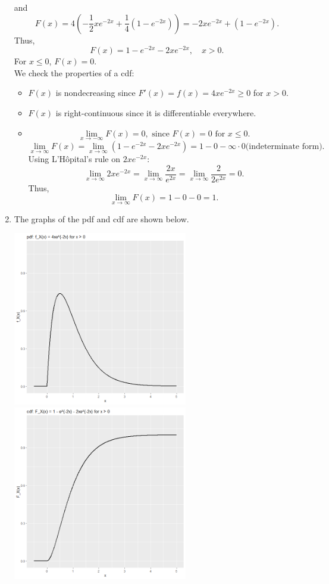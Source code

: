 \documentclass[12pt]{article}
\newenvironment{problem}[2][Problem]{\begin{trivlist}
\item[\hskip \labelsep {\bfseries #1}\hskip \labelsep {\bfseries #2.}]}
{\end{trivlist}}
\begin{document}
\begin{problem}{8}
\begin{enumerate}
\[    \]
    and
    \[
      F(x) = 4\left(-\frac{1}{2}xe^{-2x} + \frac{1}{4}(1 - e^{-2x})\right) = -2xe^{-2x} + (1 - e^{-2x}).
    \]
    Thus,
    \[
      F(x) = 1 - e^{-2x} - 2xe^{-2x}, \quad x > 0.
    \]
    For $x \le 0$, $F(x) = 0$.\\
    We check the properties of a cdf:
    \begin{itemize}
      \item[i.] $F(x)$ is nondecreasing since $F'(x) = f(x) = 4xe^{-2x} \ge 0$ for $x > 0$.
      \item[ii.] $F(x)$ is right-continuous since it is differentiable everywhere.
      \item[iii.] 
      \[
        \lim_{x \to -\infty} F(x) = 0, \text{ since } F(x) = 0 \text{ for } x \le 0.
      \]
      \[
        \lim_{x \to \infty} F(x) 
        = \lim_{x \to \infty} (1 - e^{-2x} - 2xe^{-2x}) 
        = 1 - 0 - \infty \cdot 0 \text{(indeterminate form)}.
      \]
      Using L'Hôpital's rule on $2xe^{-2x}$:
      \[
        \lim_{x \to \infty} 2xe^{-2x} 
        = \lim_{x \to \infty} \frac{2x}{e^{2x}} 
        = \lim_{x \to \infty} \frac{2}{2e^{2x}} = 0.
      \]
      Thus,
      \[
        \lim_{x \to \infty} F(x) = 1 - 0 - 0 = 1.
      \]
    \end{itemize}
    \item The graphs of the pdf and cdf are shown below.
    \begin{center}
      \includegraphics[width=0.6\textwidth]{8pdf.png}
      \includegraphics[width=0.6\textwidth]{8cdf.png}

\end{center}
\end{enumerate}
\end{problem}
\end{document}
